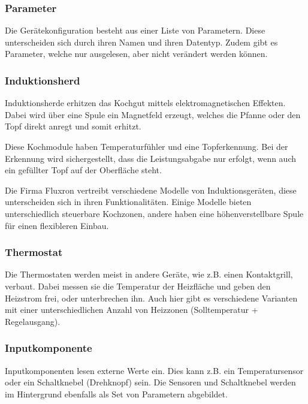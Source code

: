 \subsubsection{Parameter}
\label{subsubsec:Parameter}
Die Gerätekonfiguration besteht aus einer Liste von Parametern. Diese unterscheiden sich durch ihren Namen und ihren Datentyp. Zudem gibt es Parameter, welche nur ausgelesen, aber nicht verändert werden können.

\subsubsection{Induktionsherd}
\label{subsubsec:Induktionsherd}
Induktionsherde erhitzen das Kochgut mittels elektromagnetischen Effekten. Dabei wird über eine Spule ein Magnetfeld erzeugt, welches die Pfanne oder den Topf direkt anregt und somit erhitzt.

Diese Kochmodule haben Temperaturfühler und eine Topferkennung. Bei der Erkennung wird sichergestellt, dass die Leistungsabgabe nur erfolgt, wenn auch ein gefüllter Topf auf der Oberfläche steht.

Die Firma Fluxron vertreibt verschiedene Modelle von Induktionsgeräten, diese unterscheiden sich in ihren Funktionalitäten. Einige Modelle bieten unterschiedlich steuerbare Kochzonen, andere haben eine höhenverstellbare Spule für einen flexibleren Einbau.

\subsubsection{Thermostat}
\label{subsubsec:Thermostat}

Die Thermostaten werden meist in andere Geräte, wie z.B. einen Kontaktgrill, verbaut. Dabei messen sie die Temperatur der Heizfläche und geben den Heizstrom frei, oder unterbrechen ihn. Auch hier gibt es verschiedene Varianten mit einer unterschiedlichen Anzahl von Heizzonen (Solltemperatur + Regelausgang).

\subsubsection{Inputkomponente}
\label{subsubsec:Inputkomponente}

Inputkomponenten lesen externe Werte ein. Dies kann z.B. ein Temperatursensor oder ein Schaltknebel (Drehknopf) sein. Die Sensoren und Schaltknebel werden im Hintergrund ebenfalls als Set von Parametern abgebildet.